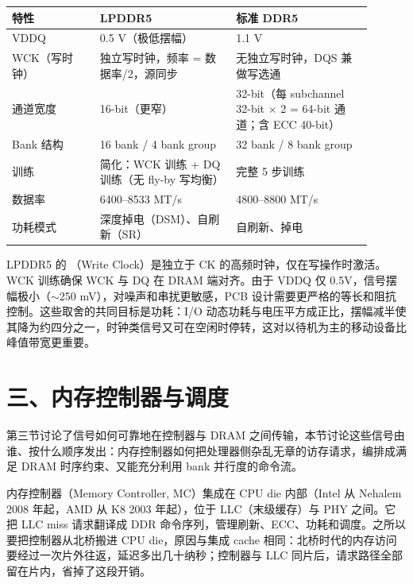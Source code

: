 \begin{longtable}{L{0.22\linewidth}L{0.34\linewidth}L{0.34\linewidth}}
\toprule
特性 & LPDDR5 & 标准 DDR5 \\
\midrule
VDDQ & 0.5 V（极低摆幅） & 1.1 V \\\tablerowrule
WCK（写时钟） & 独立写时钟，频率 = 数据率/2，源同步 & 无独立写时钟，DQS 兼做写选通 \\\tablerowrule
通道宽度 & 16-bit（更窄） & 32-bit（每 subchannel 32-bit $\times$ 2 = 64-bit 通道；含 ECC 40-bit） \\\tablerowrule
Bank 结构 & 16 bank / 4 bank group & 32 bank / 8 bank group \\\tablerowrule
训练 & 简化：WCK 训练 + DQ 训练（无 fly-by 写均衡） & 完整 5 步训练 \\\tablerowrule
数据率 & 6400--8533 MT/s & 4800--8800 MT/s \\\tablerowrule
功耗模式 & 深度掉电（DSM）、自刷新（SR） & 自刷新、掉电 \\
\bottomrule
\end{longtable}

LPDDR5 的 （Write Clock）是独立于 CK 的高频时钟，仅在写操作时激活。WCK 训练确保 WCK 与 DQ 在 DRAM 端对齐。由于 VDDQ 仅 0.5V，信号摆幅极小（$\sim$250 mV），对噪声和串扰更敏感，PCB 设计需要更严格的等长和阻抗控制。这些取舍的共同目标是功耗：I/O 动态功耗与电压平方成正比，摆幅减半使其降为约四分之一，时钟类信号又可在空闲时停转，这对以待机为主的移动设备比峰值带宽更重要。

\section{三、内存控制器与调度}


第三节讨论了信号如何可靠地在控制器与 DRAM 之间传输，本节讨论这些信号由谁、按什么顺序发出：内存控制器如何把处理器侧杂乱无章的访存请求，编排成满足 DRAM 时序约束、又能充分利用 bank 并行度的命令流。

内存控制器（Memory Controller, MC）集成在 CPU die 内部（Intel 从 Nehalem 2008 年起，AMD 从 K8 2003 年起），位于 LLC（末级缓存）与 PHY 之间。它把 LLC miss 请求翻译成 DDR 命令序列，管理刷新、ECC、功耗和调度。之所以要把控制器从北桥搬进 CPU die，原因与集成 cache 相同：北桥时代的内存访问要经过一次片外往返，延迟多出几十纳秒；控制器与 LLC 同片后，请求路径全部留在片内，省掉了这段开销。

